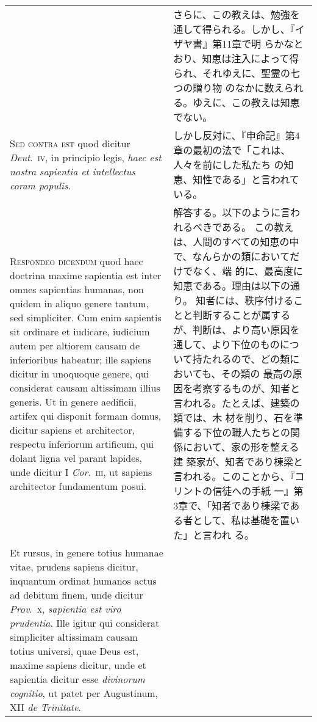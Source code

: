 \documentclass[10pt]{jsarticle} %
\begin{document}
\begin{longtable}{p{21em}p{21em}}
&

さらに、この教えは、勉強を通して得られる。しかし、『イザヤ書』第11章で明
 らかなとおり、知恵は注入によって得られ、それゆえに、聖霊の七つの贈り物
 のなかに数えられる。ゆえに、この教えは知恵でない。


\\


{\scshape Sed contra est} quod dicitur {\itshape Deut}.~{\scshape iv}, in
principio legis, {\itshape haec est nostra sapientia et intellectus coram populis}.

&

しかし反対に、『申命記』第4章の最初の法で「これは、人々を前にした私たち
 の知恵、知性である」と言われている。

\\


{\scshape Respondeo dicendum} quod haec doctrina maxime
sapientia est inter omnes sapientias humanas, non quidem in aliquo
genere tantum, sed simpliciter. Cum enim sapientis sit ordinare et
iudicare, iudicium autem per altiorem causam de inferioribus habeatur;
ille sapiens dicitur in unoquoque genere, qui considerat causam
altissimam illius generis. Ut in genere aedificii, artifex qui disponit
formam domus, dicitur sapiens et architector, respectu inferiorum
artificum, qui dolant ligna vel parant lapides, unde dicitur I {\itshape Cor}.~{\scshape iii},
ut sapiens architector fundamentum posui. 


&


解答する。以下のように言われるべきである。
この教えは、人間のすべての知恵の中で、なんらかの類においてだけでなく、端
 的に、最高度に知恵である。理由は以下の通り。
知者には、秩序付けることと判断することが属するが、判断は、より高い原因を
 通して、より下位のものについて持たれるので、どの類においても、その類の
 最高の原因を考察するものが、知者と言われる。たとえば、建築の類では、木
 材を削り、石を準備する下位の職人たちとの関係において、家の形を整える建
 築家が、知者であり棟梁と言われる。このことから、『コリントの信徒への手紙
 一』第3章で、「知者であり棟梁である者として、私は基礎を置いた」と言われ
 る。


\\


Et rursus, in genere totius
humanae vitae, prudens sapiens dicitur, inquantum ordinat humanos actus
ad debitum finem, unde dicitur {\itshape Prov}.~{\scshape x}, {\itshape sapientia est viro
prudentia}. Ille igitur qui considerat simpliciter altissimam causam
totius universi, quae Deus est, maxime sapiens dicitur, unde et
sapientia dicitur esse {\itshape divinorum cognitio}, ut patet per Augustinum, XII
{\itshape de Trinitate}. 



\end{longtable}
\end{document}
